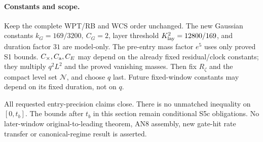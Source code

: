 \documentclass[11pt]{article}
\numberwithin{equation}{section}
\theoremstyle{remark}\newtheorem{remark}[theorem]{Remark}
\begin{document}
\paragraph{Constants and scope.}
Keep the complete WPT/RB and WCS order unchanged.
The new Gaussian constants \(k_G=169/3200,\ C_G=2\),
layer threshold \(K_{\rm lay}^2=12800/169\), and duration
factor \(31\) are model-only. The pre-entry mass factor
\(e^5\) uses only proved S1 bounds. \(C_\times,C_{\rm a},C_E\)
may depend on the already fixed residual/clock constants;
they multiply \(q^2L^2\) and the proved vanishing masses.
Then fix \(R_\zeta\) and the compact level set \(\mathcal N\),
and choose \(q\) last. Future fixed-window constants may
depend on its fixed duration, not on \(q\).

All requested entry-precision claims close. There is no
unmatched inequality on \([0,t_b]\). The bounds after
\(t_b\) in this section remain conditional S5c obligations.
No later-window original-to-leading theorem, AN8 assembly,
new gate-hit rate transfer or canonical-regime result is asserted.
\end{document}
